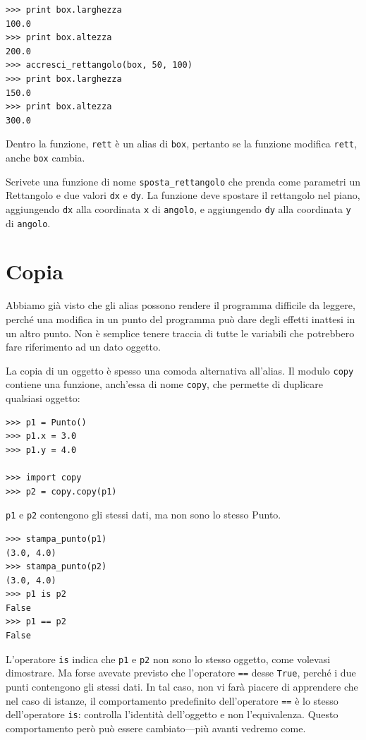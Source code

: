 \documentclass[10pt]{book}
\begin{document}
\begin{verbatim}
>>> print box.larghezza
100.0
>>> print box.altezza
200.0
>>> accresci_rettangolo(box, 50, 100)
>>> print box.larghezza
150.0
>>> print box.altezza
300.0
\end{verbatim}
%
Dentro la funzione, {\tt rett} è un alias di {\tt box}, pertanto se la funzione modifica {\tt rett}, anche {\tt box} cambia.

\vspace{0.2in}
\begin{exercise}

Scrivete una funzione di nome \verb"sposta_rettangolo" che prenda come parametri un Rettangolo e due valori {\tt dx} e {\tt dy}.  La funzione deve spostare il rettangolo nel piano, aggiungendo {\tt dx} alla coordinata {\tt x} di {\tt angolo}, e aggiungendo {\tt dy} alla coordinata {\tt y} di {\tt angolo}.

\end{exercise}


\section{Copia}
\label{copying}

Abbiamo già visto che gli alias possono rendere il programma difficile
   da leggere, perché una modifica in un punto del programma può dare degli effetti inattesi in un altro punto. Non è semplice tenere traccia di tutte le variabili che potrebbero fare riferimento ad un dato oggetto.

La copia di un oggetto è spesso una comoda alternativa all'alias.
Il modulo {\tt copy} contiene una funzione, anch'essa di nome {\tt copy}, che permette di duplicare qualsiasi oggetto:

\begin{verbatim}
>>> p1 = Punto()
>>> p1.x = 3.0
>>> p1.y = 4.0

>>> import copy
>>> p2 = copy.copy(p1)
\end{verbatim}
%
{\tt p1} e {\tt p2} contengono gli stessi dati, ma non sono lo stesso Punto.

\begin{verbatim}
>>> stampa_punto(p1)
(3.0, 4.0)
>>> stampa_punto(p2)
(3.0, 4.0)
>>> p1 is p2
False
>>> p1 == p2
False
\end{verbatim}
%
L'operatore {\tt is} indica che {\tt p1} e {\tt p2} non sono lo stesso oggetto, come volevasi dimostrare. Ma forse avevate previsto che l'operatore {\tt ==} desse {\tt True}, perché i due punti contengono gli stessi dati. In tal caso, non vi farà piacere di apprendere che nel caso di istanze, il comportamento predefinito dell'operatore {\tt ==} è lo stesso dell'operatore {\tt is}: controlla l'identità dell'oggetto e non l'equivalenza. Questo comportamento però può essere cambiato---più avanti vedremo come.
\end{document}

